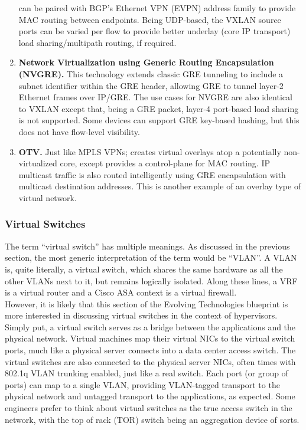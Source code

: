 \begin{enumerate}
  can be paired with BGP’s Ethernet VPN (EVPN) address family to provide MAC
  routing between endpoints. Being UDP-based, the VXLAN source ports can be
  varied per flow to provide better underlay (core IP transport) load
  sharing/multipath routing, if required.
  \item \textbf{Network Virtualization using Generic Routing Encapsulation
  (NVGRE).} This technology extends classic GRE tunneling to include a subnet
  identifier within the GRE header, allowing GRE to tunnel layer-2 Ethernet
  frames over IP/GRE\@. The use cases for NVGRE are also identical to VXLAN
  except that, being a GRE packet, layer-4 port-based load sharing is not
  supported. Some devices can support GRE key-based hashing, but this does not
  have flow-level visibility.
  \item \textbf{OTV.} Just like MPLS VPNs; creates virtual overlays atop a
  potentially non-virtualized core, except provides a control-plane for MAC
  routing. IP multicast traffic is also routed intelligently using GRE
  encapsulation with multicast destination addresses. This is another example
  of an overlay type of virtual network.
\end{enumerate}

\subsubsection{Virtual Switches}
The term ``virtual switch'' has multiple meanings. As discussed in the previous
section, the most generic interpretation of the term would be ``VLAN''. A VLAN
is, quite literally, a virtual switch, which shares the same hardware as all
the other VLANs next to it, but remains logically isolated. Along these lines,
a VRF is a virtual router and a Cisco ASA context is a virtual firewall. \\

However, it is likely that this section of the Evolving Technologies blueprint
is more interested in discussing virtual switches in the context of
hypervisors. Simply put, a virtual switch serves as a bridge between the
applications and the physical network. Virtual machines map their virtual NICs
to the virtual switch ports, much like a physical server connects into a data
center access switch. The virtual switches are also connected to the physical
server NICs, often times with 802.1q VLAN trunking enabled, just like a real
switch. Each port (or group of ports) can map to a single VLAN, providing
VLAN-tagged transport to the physical network and untagged transport to the
applications, as expected. Some engineers prefer to think about virtual
switches as the true access switch in the network, with the top of rack (TOR)
switch being an aggregation device of sorts. \\


